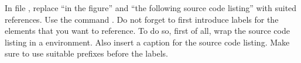 In file , replace \enquote{in the 
figure} and \enquote{the following source code listing} with suited references. 
Use the command . Do not forget to first 
introduce 
labels for the elements that you want to reference. To do so, first of all, 
wrap the source code listing in a  environment. Also 
insert a caption for the source code listing. 
Make sure to use suitable prefixes before the labels.


